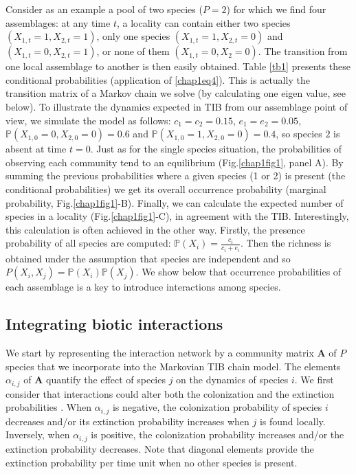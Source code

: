 Consider as an example a pool of two species ($P=2$) for which we find four assemblages: at any time $t$, a locality can contain either two species $(X_{1,t}=1, X_{2,t}=1)$, only one species $(X_{1,t}=1, X_{2,t}=0)$ and $(X_{1,t}=0, X_{2,t}=1)$, or none of them $(X_{1,t}=0, X_2=0)$. The transition from one local assemblage to another is then easily obtained. Table \ref{tb1} presents these conditional probabilities (application of \eqref{chap1eq4}). This is actually the transition matrix of a Markov chain we solve (by calculating one eigen value, see below). To illustrate the dynamics expected in TIB from our assemblage point of view, we simulate the model as follows: $c_1=c_2=0.15$, $e_1=e_2=0.05$, $\mathbb{P}(X_{1,0}=0, X_{2,0}=0)=0.6$ and $\mathbb{P}(X_{1,0}=1, X_{2,0}=0)=0.4$, so species $2$ is absent at time $t=0$.
Just as for the single species situation, the probabilities of observing each community tend to an equilibrium (Fig.\ref{chap1fig1}, panel A). By summing the previous probabilities where a given species (1 or 2) is present (the conditional probabilities) we get its overall occurrence probability (marginal probability, Fig.\ref{chap1fig1}-B). Finally, we can calculate the expected number of species in a locality (Fig.\ref{chap1fig1}-C), in agreement with the TIB. Interestingly, this calculation is often achieved in the other way. Firstly, the presence probability of all species are computed: $\mathbb{P}(X_i)=\frac{c_i}{c_i+e_i}$. Then the richness is obtained under the assumption that species are independent and so $P(X_i,X_j)=\mathbb{P}(X_i)\mathbb{P}(X_j)$. We show below that occurrence probabilities of each assemblage is a key to introduce interactions among species.


\subsection{Integrating biotic interactions}

We start by representing the interaction network by a community matrix $\mathbf{A}$ of $P$ species that we incorporate into the Markovian TIB chain model. The elements $\alpha_{i,j}$ of $\mathbf{A}$ quantify the effect of species $j$ on the dynamics of species $i$. We first consider that interactions could alter both the colonization and the extinction probabilities \citep{Gravel2011}. When $\alpha_{i,j}$ is negative, the colonization probability of species $i$ decreases and/or its extinction probability increases when $j$ is found locally. Inversely, when $\alpha_{i,j}$ is positive, the colonization probability increases and/or the extinction probability decreases. Note that diagonal elements provide the extinction probability per time unit when no other species is present.

